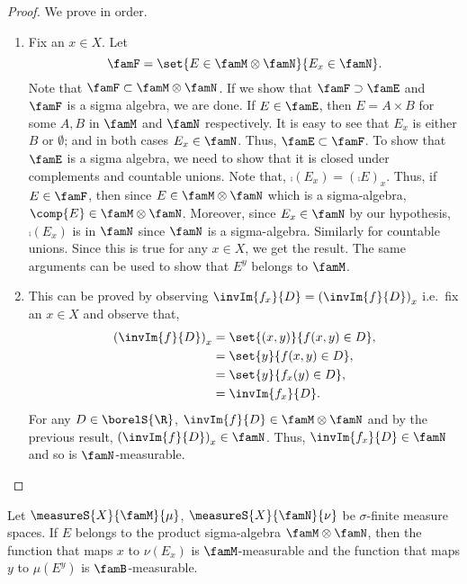 \begin{proof}
    We prove in order.
    \begin{enumerate}
	\item
	    Fix an $x \in X$.
	    Let \[\famF = \set{E\in\famM\otimes\famN}{E_x \in \famN}.\]
	    Note that $\famF \subset \famM\otimes\famN$. If we show that $\famF \supset \famE$ and $\famF$ is
	    a sigma algebra, we are done.
	    If $E \in \famE$, then $E = A \times B$ for some $A,B$ in $\famM$ and $\famN$ respectively. It is
	    easy to see that $E_x$ is either $B$ or $\emptyset$; and in both cases $E_x \in \famN$. Thus,
	    $\famE \subset \famF$. To show that $\famE$ is a sigma algebra, we need to show that it is closed
	    under complements and countable unions. Note that,
	    $\comp{(E_x)} = {(\comp{E})}_{x}$. Thus, if $E \in \famF$, then since $E \in \famM\otimes\famN$
	    which is a sigma-algebra, $\comp{E} \in \famM\otimes\famN$. Moreover, since $E_x \in \famN$ by
	    our hypothesis, $\comp{(E_x)}$ is in $\famN$ since $\famN$ is a sigma-algebra. Similarly for
	    countable unions. Since this is true for any $x \in X$, we get the result. The same arguments can
	    be used to show that $E^{y}$ belongs to $\famM$.
	\item
	    This can be proved by observing $\invIm{f_x}{D} = {(\invIm{f}{D})}_{x}$ i.e.~fix an $x \in X$ and
	    observe that,
	    \begin{equation*}
		\begin{aligned}
		    {(\invIm{f}{D})}_{x} &= \set{(x,y)}{f(x,y)\in D}, \\
		    &= \set{y}{f(x,y)\in D},\\
		    &= \set{y}{f_x(y) \in D},\\
		    &= \invIm{f_x}{D}.
		\end{aligned}
	    \end{equation*}
	    For any $D \in \borelS{\R}$, $\invIm{f}{D} \in \famM\otimes\famN$ and by the previous result,
	    ${(\invIm{f}{D})}_{x} \in \famN$. Thus, $\invIm{f_x}{D} \in \famN$ and so is $\famN$-measurable.
    \end{enumerate}
\end{proof}
\begin{Proposition}
    Let $\measureS{X}{\famM}{\mu}$, $\measureS{X}{\famN}{\nu}$ be $\sigma$-finite measure spaces. If $E$
    belongs to the product sigma-algebra $\famM\otimes\famN$, then the function that maps $x$ to $\nu(E_x)$
    is $\famM$-measurable and the function that maps $y$ to $\mu(E^{y})$ is $\famB$-measurable.
\end{Proposition}
